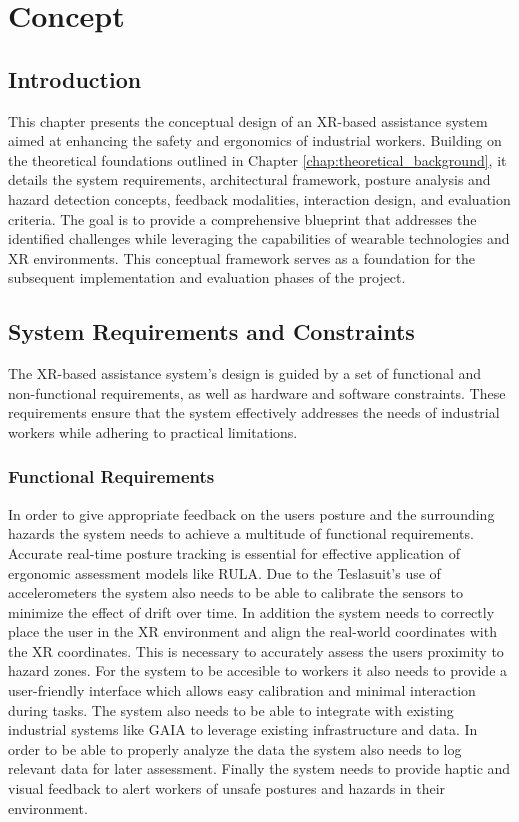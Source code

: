 \chapter{Concept}
\label{chap:concept}

\section{Introduction}
This chapter presents the conceptual design of an XR-based assistance system aimed at enhancing the safety and ergonomics of industrial workers. Building on the theoretical foundations outlined in Chapter \ref{chap:theoretical_background}, it details the system requirements, architectural framework, posture analysis and hazard detection concepts, feedback modalities, interaction design, and evaluation criteria. The goal is to provide a comprehensive blueprint that addresses the identified challenges while leveraging the capabilities of wearable technologies and XR environments. This conceptual framework serves as a foundation for the subsequent implementation and evaluation phases of the project.

\section{System Requirements and Constraints}
The XR-based assistance system's design is guided by a set of functional and non-functional requirements, as well as hardware and software constraints. These requirements ensure that the system effectively addresses the needs of industrial workers while adhering to practical limitations.

\subsection{Functional Requirements}
In order to give appropriate feedback on the users posture and the surrounding hazards the system needs to achieve a multitude of functional requirements. 
Accurate real-time posture tracking is essential for effective application of ergonomic assessment models like RULA. Due to the Teslasuit's use of accelerometers the system also needs to be able to calibrate the sensors to minimize the effect of drift over time. In addition the system needs to correctly place the user in the XR environment and align the real-world coordinates with the XR coordinates. This is necessary to accurately assess the users proximity to hazard zones. For the system to be accesible to workers it also needs to provide a user-friendly interface which allows easy calibration and minimal interaction during tasks. The system also needs to be able to integrate with existing industrial systems like GAIA to leverage existing infrastructure and data. In order to be able to properly analyze the data the system also needs to log relevant data for later assessment. Finally the system needs to provide haptic and visual feedback to alert workers of unsafe postures and hazards in their environment.

